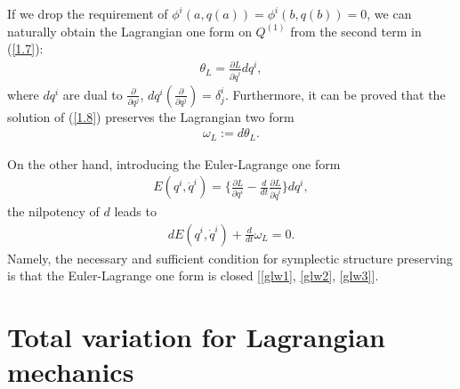 \documentclass[a4paper,a4paper]{article}
\def\sect#1{\section{#1}\setcounter{equation}{0}}
\begin{document}
If we drop the requirement of $\phi^i(a, q(a))=\phi^i(b, q(b))=0$,  we
can naturally obtain the Lagrangian one form on $Q^{(1)}$ from the
second term in (\ref{1.7}):
\begin{align}
\theta_{L}=\frac{\partial L}{\partial \dot{q}^i}dq^i,\label{1.9}
\end{align}
where $dq^i$ are dual to $\frac{\partial}{\partial q^j}$,
$dq^i(\frac{\partial}{\partial q^j})=\delta_j^i$.
Furthermore, %
it can be proved that the solution of (\ref{1.8}) preserves the
Lagrangian two form
\begin{align}
\omega_L:=d\theta_{L}. \label{1.10}
\end{align}%

 On the other hand,
introducing the Euler-Lagrange one form
\begin{align}
 E(q^i, \dot q^i)=\{\frac{\partial L}{\partial q^i}-\frac{d}{dt}
          \frac{\partial L}{\partial \dot{q}^{i}}\}dq^i, \label{1.11}
\end{align}
the nilpotency of $d$ leads to%
\begin{align}
dE(q^i, \dot q^i)+\frac{d}{dt}\omega_L=0. \label{1.12}\end{align}
 Namely, the
necessary and sufficient condition for symplectic structure
preserving is that the Euler-Lagrange one form is closed
[\ref{glw1}, \ref{glw2}, \ref{glw3}].




\sect{Total variation  for Lagrangian mechanics}
\end{document}
